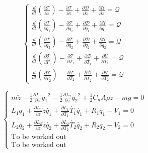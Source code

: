 \begin{equation}
    \begin{cases}
        \frac{d}{dt} \left( \frac{\partial \mathcal{T}}{\partial \dot{z}} \right) - \frac{\partial \mathcal{T}}{\partial z} + \frac{\partial \mathcal{D}}{\partial \dot{z}} + \frac{\partial \mathcal{U}}{\partial z} = \mathcal{Q}         \\
        \frac{d}{dt} \left( \frac{\partial \mathcal{T}}{\partial \dot{q_1}} \right) - \frac{\partial \mathcal{T}}{\partial q_1} + \frac{\partial \mathcal{D}}{\partial \dot{q_1}} + \frac{\partial \mathcal{U}}{\partial q_1} = \mathcal{Q} \\
        \frac{d}{dt} \left( \frac{\partial \mathcal{T}}{\partial \dot{q_2}} \right) - \frac{\partial \mathcal{T}}{\partial q_2} + \frac{\partial \mathcal{D}}{\partial \dot{q_2}} + \frac{\partial \mathcal{U}}{\partial q_2} = \mathcal{Q} \\
        \frac{d}{dt} \left( \frac{\partial \mathcal{T}}{\partial \dot{T_1}} \right) - \frac{\partial \mathcal{T}}{\partial T_1} + \frac{\partial \mathcal{D}}{\partial \dot{T_1}} + \frac{\partial \mathcal{U}}{\partial T_1} = \mathcal{Q} \\
        \frac{d}{dt} \left( \frac{\partial \mathcal{T}}{\partial \dot{T_2}} \right) - \frac{\partial \mathcal{T}}{\partial T_2} + \frac{\partial \mathcal{D}}{\partial \dot{T_2}} + \frac{\partial \mathcal{U}}{\partial T_2} = \mathcal{Q}
    \end{cases}
\end{equation}

\begin{equation}
    \begin{cases}
        m \ddot{z} - \frac{1}{2} \frac{\partial L_1}{\partial z} \dot{q_1}^2 - \frac{1}{2} \frac{\partial L_2}{\partial z} \dot{q_2}^2 + \frac{1}{2} C_d A \rho \dot{z} - m g = 0 \\
        L_1 \ddot{q_1} + \frac{\partial L_1}{\partial z} \dot{z} \dot{q_1} + \frac{\partial L_1}{\partial T_1} \dot{T_1} \dot{q_1} + R_1 \dot{q_1} - V_1 = 0                      \\
        L_2 \ddot{q_2} + \frac{\partial L_2}{\partial z} \dot{z} \dot{q_2} + \frac{\partial L_2}{\partial T_2} \dot{T_2} \dot{q_2} + R_2 \dot{q_2} - V_2 = 0                      \\
        \text{To be worked out}                                                                                                                                                   \\
        \text{To be worked out}
    \end{cases}
\end{equation}

